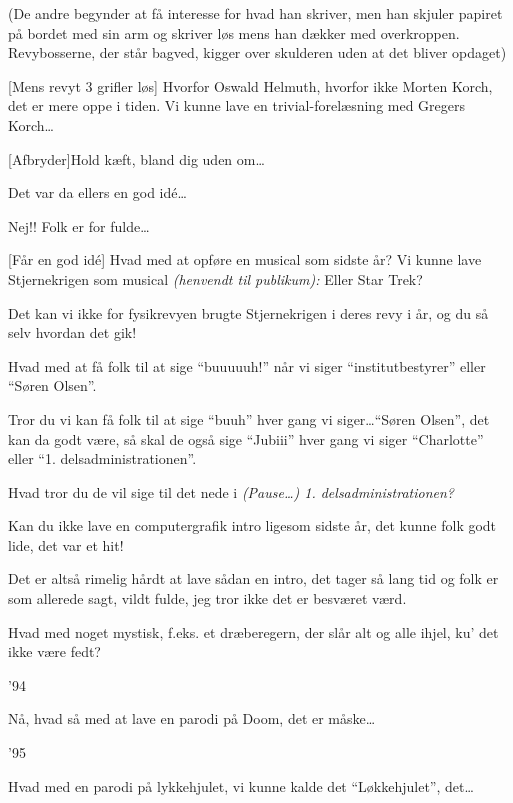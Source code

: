 \documentclass[10pt]{article}
\begin{document}
\begin{sketch}
\scene (De andre begynder at få interesse for hvad han skriver, men han
skjuler papiret på bordet med sin arm og skriver løs mens han dækker med
overkroppen. Revybosserne, der står bagved, kigger over skulderen uden at det
bliver opdaget)

 [Mens revyt 3 grifler løs] Hvorfor Oswald Helmuth, hvorfor
ikke Morten Korch, det er mere oppe i tiden. Vi kunne lave en
trivial-forelæsning med Gregers Korch\ldots

 [Afbryder]Hold kæft, bland dig uden om\ldots

 Det var da ellers en god id\'e\ldots

 Nej!! Folk er for fulde\ldots

[Får en god id\'e] Hvad med at opføre en musical som sidste
år? Vi kunne lave Stjernekrigen som musical {\em (henvendt til publikum):}
Eller Star Trek?

 Det kan vi ikke for fysikrevyen brugte
Stjernekrigen i deres revy i år, og du så selv hvordan det gik!


 Hvad med at få folk til at sige ``buuuuuh!'' når vi siger
``institutbestyrer'' eller ``Søren Olsen''.

 Tror du vi kan få folk til at sige ``buuh'' hver gang vi
siger\ldots  ``Søren Olsen'', det kan da godt være, så skal de også sige
``Jubiii'' hver gang vi siger ``Charlotte'' eller
``1. delsadministrationen''.

 Hvad tror du de vil sige til det nede i \em{(Pause\ldots )}
1. delsadministrationen?

 Kan du ikke lave en computergrafik intro ligesom sidste
år, det kunne folk godt lide, det var et hit!

 Det er altså rimelig hårdt at lave sådan en intro, det
tager så lang tid og folk er som allerede sagt, vildt fulde, jeg tror ikke
det er besværet værd.

 Hvad med noget mystisk, f.eks. et dræberegern, der slår alt
og alle ihjel, ku' det ikke være fedt?

 '94

 Nå, hvad så med at lave en parodi på Doom, det er
måske\ldots

 '95

 Hvad med en parodi på lykkehjulet, vi kunne kalde det
``Løkkehjulet'', det\ldots


\end{sketch}
\end{document}

